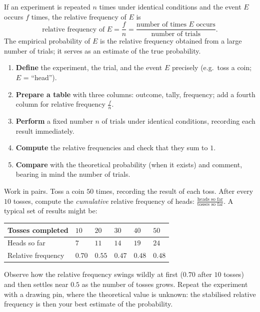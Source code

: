 \documentclass[11pt]{article}
\newcommand{\cle}[1]{{\popxbold\color{popdark}#1}}
\begin{document}
\begin{definition}
If an experiment is repeated $n$ times under identical conditions and the event $E$ occurs $f$ times, the \cle{relative frequency} of $E$ is
\[
\text{relative frequency of } E = \frac{f}{n} = \frac{\text{number of times } E \text{ occurs}}{\text{number of trials}}.
\]
The \cle{empirical probability} of $E$ is the relative frequency obtained from a large number of trials; it serves as an estimate of the true probability.
\end{definition}

\begin{methode}
\begin{enumerate}
\item \textbf{Define} the experiment, the trial, and the event $E$ precisely (e.g.\ toss a coin; $E$ = ``head'').
\item \textbf{Prepare a table} with three columns: outcome, tally, frequency; add a fourth column for relative frequency $\frac{f}{n}$.
\item \textbf{Perform} a fixed number $n$ of trials under identical conditions, recording each result immediately.
\item \textbf{Compute} the relative frequencies and check that they sum to $1$.
\item \textbf{Compare} with the theoretical probability (when it exists) and comment, bearing in mind the number of trials.
\end{enumerate}
\end{methode}

\begin{experience}
Work in pairs. Toss a coin $50$ times, recording the result of each toss. After every $10$ tosses, compute the \emph{cumulative} relative frequency of heads: $\frac{\text{heads so far}}{\text{tosses so far}}$. A typical set of results might be:

\begin{center}
\begin{tabularx}{\linewidth}{|l|X|X|X|X|X|}
\hline
\rowcolor{popblueL} Tosses completed & $10$ & $20$ & $30$ & $40$ & $50$ \\
\hline Heads so far & $7$ & $11$ & $14$ & $19$ & $24$ \\
\hline Relative frequency & $0.70$ & $0.55$ & $0.47$ & $0.48$ & $0.48$ \\
\hline
\end{tabularx}
\end{center}

Observe how the relative frequency swings wildly at first ($0.70$ after $10$ tosses) and then settles near $0.5$ as the number of tosses grows. Repeat the experiment with a drawing pin, where the theoretical value is unknown: the stabilised relative frequency is then your best estimate of the probability.
\end{experience}
\end{document}
